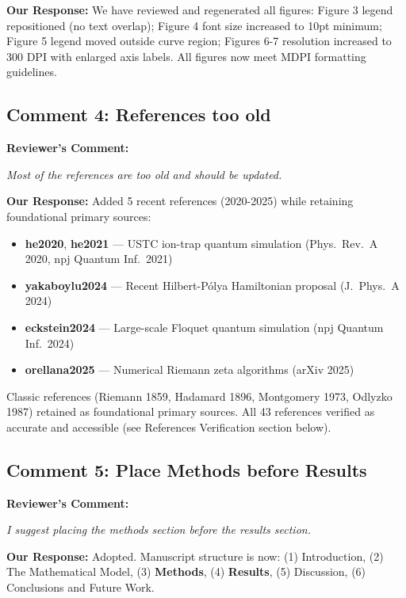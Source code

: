 \documentclass[11pt]{article}
\begin{document}
\noindent\textbf{Our Response:} We have reviewed and regenerated all figures: Figure 3 legend repositioned (no text overlap); Figure 4 font size increased to 10pt minimum; Figure 5 legend moved outside curve region; Figures 6-7 resolution increased to 300 DPI with enlarged axis labels. All figures now meet MDPI formatting guidelines.

\subsection*{Comment 4: References too old}

\noindent\textbf{Reviewer's Comment:}
\begin{quotebox}
\itshape Most of the references are too old and should be updated.
\end{quotebox}

\noindent\textbf{Our Response:} Added 5 recent references (2020-2025) while retaining foundational primary sources:
\begin{itemize}
\item \textbf{he2020}, \textbf{he2021} --- USTC ion-trap quantum simulation (Phys.~Rev.~A 2020, npj Quantum Inf.~2021)
\item \textbf{yakaboylu2024} --- Recent Hilbert-P\'olya Hamiltonian proposal (J.~Phys.~A 2024)
\item \textbf{eckstein2024} --- Large-scale Floquet quantum simulation (npj Quantum Inf.~2024)
\item \textbf{orellana2025} --- Numerical Riemann zeta algorithms (arXiv 2025)
\end{itemize}
Classic references (Riemann 1859, Hadamard 1896, Montgomery 1973, Odlyzko 1987) retained as foundational primary sources. All 43 references verified as accurate and accessible (see References Verification section below).

\subsection*{Comment 5: Place Methods before Results}

\noindent\textbf{Reviewer's Comment:}
\begin{quotebox}
\itshape I suggest placing the methods section before the results section.
\end{quotebox}

\noindent\textbf{Our Response:} Adopted. Manuscript structure is now: (1) Introduction, (2) The Mathematical Model, (3) \textbf{Methods}, (4) \textbf{Results}, (5) Discussion, (6) Conclusions and Future Work.
\end{document}
